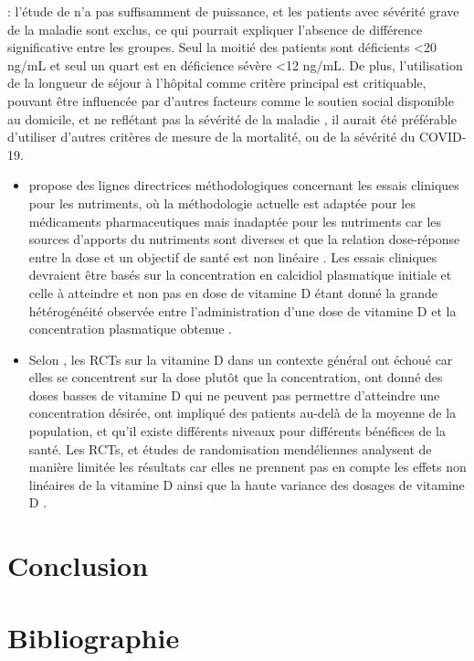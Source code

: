 \documentclass[
  a4paper,
  DIV=11,
  numbers=noendperiod,
  listof=totoc]{scrreprt}
\begin{document}
\autocite{Leaf.2021,Annweiler.2021} : l'étude de \textcite{Murai.2021}
n'a pas suffisamment de puissance, et les patients avec sévérité grave
de la maladie sont exclus, ce qui pourrait expliquer l'absence de
différence significative entre les groupes. Seul la moitié des patients
sont déficients \textless20 ng/mL et seul un quart est en déficience
sévère \textless12 ng/mL. De plus, l'utilisation de la longueur de
séjour à l'hôpital comme critère principal est critiquable, pouvant être
influencée par d'autres facteurs comme le soutien social disponible au
domicile, et ne reflétant pas la sévérité de la maladie
\autocite{Annweiler.2021}, il aurait été préférable d'utiliser d'autres
critères de mesure de la mortalité, ou de la sévérité du COVID-19.

\begin{itemize}
\item
  \textcite{Heaney.2014} propose des lignes directrices méthodologiques
  concernant les essais cliniques pour les nutriments, où la
  méthodologie actuelle est adaptée pour les médicaments pharmaceutiques
  mais inadaptée pour les nutriments car les sources d'apports du
  nutriments sont diverses et que la relation dose-réponse entre la dose
  et un objectif de santé est non linéaire
  \autocite{Grant.2022.nutrients}. Les essais cliniques devraient être
  basés sur la concentration en calcidiol plasmatique initiale et celle
  à atteindre et non pas en dose de vitamine D étant donné la grande
  hétérogénéité observée entre l'administration d'une dose de vitamine D
  et la concentration plasmatique obtenue
  \autocite{Grant.2022.nutrients}.
\item
  Selon \textcite{Grant.2022.nutrients}, les RCTs sur la vitamine D dans
  un contexte général ont échoué car elles se concentrent sur la dose
  plutôt que la concentration, ont donné des doses basses de vitamine D
  qui ne peuvent pas permettre d'atteindre une concentration désirée,
  ont impliqué des patients au-delà de la moyenne de la population, et
  qu'il existe différents niveaux pour différents bénéfices de la santé.
  Les RCTs, et études de randomisation mendéliennes analysent de manière
  limitée les résultats car elles ne prennent pas en compte les effets
  non linéaires de la vitamine D ainsi que la haute variance des dosages
  de vitamine D \autocite{Grant.2022}.
\end{itemize}

\newpage{}

\chapter{Conclusion}\label{conclusion}

\newpage{}

\hypertarget{Bibliographie}{%
\chapter*{\centering Bibliographie}\label{Bibliographie}}
\singlespace

\printbibliography[heading=none]
\end{document}
